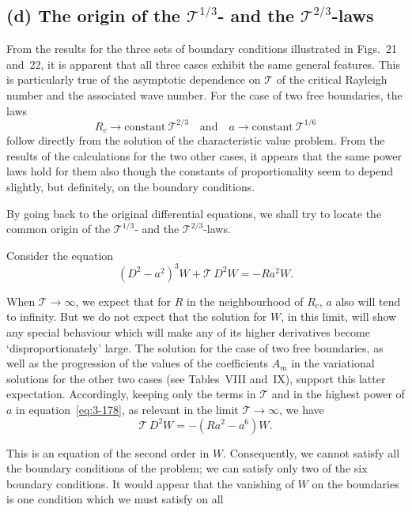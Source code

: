 \subsection*{(d) The origin of the $\mathscr{T}^{1/3}$- and the $\mathscr{T}^{2/3}$-laws}

From the results for the three sets of boundary conditions illustrated in Figs.~21 and~22, it is apparent that all three cases exhibit the same general features. This is particularly true of the asymptotic dependence on $\mathscr{T}$ of the critical Rayleigh number and the associated wave number. For the case of two free boundaries, the laws
\begin{equation}\label{eq:3-177}
R_c \to \text{constant}\ \mathscr{T}^{2/3} \quad \text{and} \quad a \to \text{constant}\ \mathscr{T}^{1/6}
\end{equation}
follow directly from the solution of the characteristic value problem. From the results of the calculations for the two other cases, it appears that the same power laws hold for them also though the constants of proportionality seem to depend slightly, but definitely, on the boundary conditions.

By going back to the original differential equations, we shall try to locate the common origin of the $\mathscr{T}^{1/3}$- and the $\mathscr{T}^{2/3}$-laws.

Consider the equation
\begin{equation}\label{eq:3-178}
(D^2 - a^2)^3 W + \mathscr{T}\,D^2 W = -Ra^2 W.
\end{equation}

When $\mathscr{T}\to\infty$, we expect that for $R$ in the neighbourhood of $R_c$, $a$ also will tend to infinity. But we do not expect that the solution for $W$, in this limit, will show any special behaviour which will make any of its higher derivatives become `disproportionately' large. The solution for the case of two free boundaries, as well as the progression of the values of the coefficients $A_m$ in the variational solutions for the other two cases (see Tables~VIII and~IX), support this latter expectation. Accordingly, keeping only the terms in $\mathscr{T}$ and in the highest power of $a$ in equation~\eqref{eq:3-178}, as relevant in the limit $\mathscr{T}\to\infty$, we have
\begin{equation}\label{eq:3-179}
\mathscr{T}\,D^2 W = -(Ra^2 - a^6)W.
\end{equation}

This is an equation of the second order in $W$. Consequently, we cannot satisfy all the boundary conditions of the problem; we can satisfy only two of the six boundary conditions. It would appear that the vanishing of $W$ on the boundaries is one condition which we must satisfy on all

